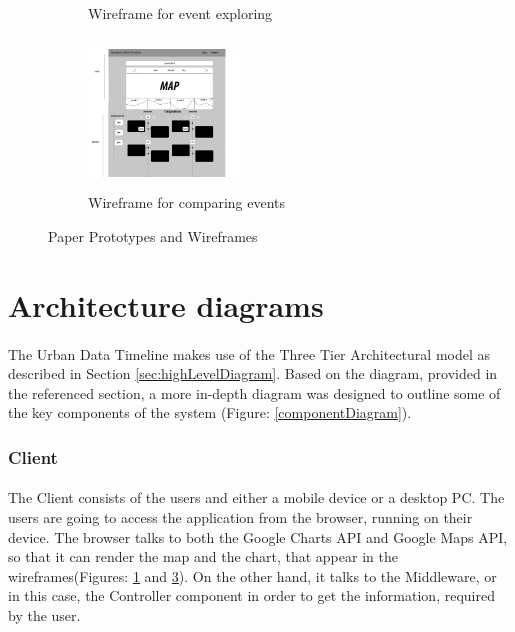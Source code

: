 \documentclass{l4proj}
\begin{document}
\begin{figure}[H]
\begin{subfigure}{.3\textwidth}
		\caption{Wireframe for event exploring}
		\label{finalPrototypeEvent}
	\end{subfigure}
	\begin{subfigure}{.3\textwidth}
		\centering
		\includegraphics[height=4cm,width=4cm]{images/FinalPrototypeCompare}
		\caption{Wireframe for comparing events}
		\label{finalPrototypeCompare}
	\end{subfigure}
	\caption{Paper Prototypes and Wireframes}
\end{figure} 

\section{Architecture diagrams}
\paragraph{}
The Urban Data Timeline makes use of the Three Tier Architectural model as described in Section \ref{sec:highLevelDiagram}. Based on the diagram, provided in the referenced section, a more in-depth diagram was designed to outline some of the key components of the system (Figure: \ref{componentDiagram}).

\subsubsection{Client}
\paragraph{}
The Client consists of the users and either a mobile device or a desktop PC. The users are going to access the application from the browser, running on their device. The browser talks to both the Google Charts API and Google Maps API, so that it can render the map and the chart, that appear in the wireframes(Figures: \ref{finalPrototypeEvent} and \ref{finalPrototypeCompare}). On the other hand, it talks to the Middleware, or in this case, the Controller component in order to get the information,  required by the user.
\end{document}
